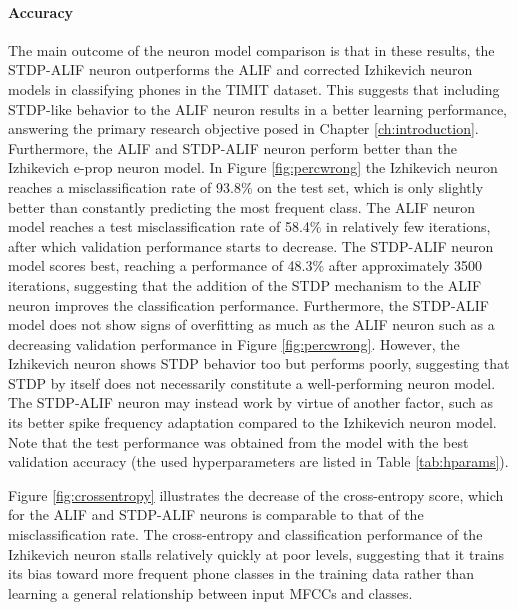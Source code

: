 		\paragraph{Accuracy}
			The main outcome of the neuron model comparison is that in these results, the STDP-ALIF neuron outperforms the ALIF and corrected Izhikevich neuron models in classifying phones in the TIMIT dataset.
			This suggests that including STDP-like behavior to the ALIF neuron results in a better learning performance, answering the primary research objective posed in Chapter \ref{ch:introduction}.
			Furthermore, the ALIF and STDP-ALIF neuron perform better than the Izhikevich e-prop neuron model.
			In Figure \ref{fig:percwrong} the Izhikevich neuron reaches a misclassification rate of 93.8\% on the test set, which is only slightly better than constantly predicting the most frequent class.
			The ALIF neuron model reaches a test misclassification rate of 58.4\% in relatively few iterations, after which validation performance starts to decrease.
			The STDP-ALIF neuron model scores best, reaching a performance of 48.3\% after approximately 3500 iterations, suggesting that the addition of the STDP mechanism to the ALIF neuron improves the classification performance.
			Furthermore, the STDP-ALIF model does not show signs of overfitting as much as the ALIF neuron such as a decreasing validation performance in Figure \ref{fig:percwrong}.
			However, the Izhikevich neuron shows STDP behavior too but performs poorly, suggesting that STDP by itself does not necessarily constitute a well-performing neuron model.
			The STDP-ALIF neuron may instead work by virtue of another factor, such as its better spike frequency adaptation compared to the Izhikevich neuron model.
			Note that the test performance was obtained from the model with the best validation accuracy (the used hyperparameters are listed in Table \ref{tab:hparams}).


			Figure \ref{fig:crossentropy} illustrates the decrease of the cross-entropy score, which for the ALIF and STDP-ALIF neurons is comparable to that of the misclassification rate.
			The cross-entropy and classification performance of the Izhikevich neuron stalls relatively quickly at poor levels, suggesting that it trains its bias toward more frequent phone classes in the training data rather than learning a general relationship between input MFCCs and classes.

